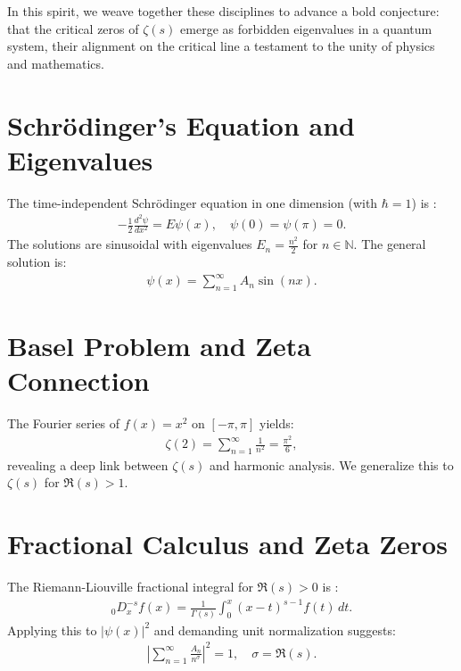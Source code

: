 \documentclass[10pt, oneside]{article}
\newcommand{\N}{\mathbb{N}}
\begin{document}
In this spirit, we weave together these disciplines to advance a bold conjecture: that the critical zeros of $\zeta(s)$ emerge as forbidden eigenvalues in a quantum system, their alignment on the critical line a testament to the unity of physics and mathematics.
\section{Schrödinger's Equation and Eigenvalues}
The time-independent Schrödinger equation in one dimension (with $\hbar = 1$) is \cite{Islam1994}:
\begin{align}
  -\frac{1}{2} \frac{d^2 \psi}{dx^2} = E \psi(x), \quad \psi(0) = \psi(\pi) = 0. \label{schrodinger}
\end{align}
The solutions are sinusoidal with eigenvalues $E_n = \frac{n^2}{2}$ for $n \in \N$. The general solution is:
\begin{align}
  \psi(x) = \sum_{n=1}^\infty A_n \sin(nx). \label{eq:wave}
\end{align}

\section{Basel Problem and Zeta Connection}
The Fourier series of $f(x) = x^2$ on $[-\pi, \pi]$ yields:
\begin{align}
  \zeta(2) = \sum_{n=1}^\infty \frac{1}{n^2} = \frac{\pi^2}{6}, \label{eq:basel}
\end{align}
revealing a deep link between $\zeta(s)$ and harmonic analysis. We generalize this to $\zeta(s)$ for $\Re(s) > 1$.

\section{Fractional Calculus and Zeta Zeros}
The Riemann-Liouville fractional integral for $\Re(s) > 0$ is \cite{Hadamard1892} \cite{Hermann2014}:
\begin{align}
  _0D_x^{-s} f(x) = \frac{1}{\Gamma(s)} \int_0^x (x-t)^{s-1} f(t) \, dt. \label{Riemann-Liouville}
\end{align}
Applying this to $|\psi(x)|^2$ and demanding unit normalization suggests:
\begin{align}
  |\sum_{n=1}^\infty \frac{A_n}{n^{\sigma}}|^2 = 1, \quad \sigma = \Re(s). \label{eq:norm}
\end{align}
\end{document}
